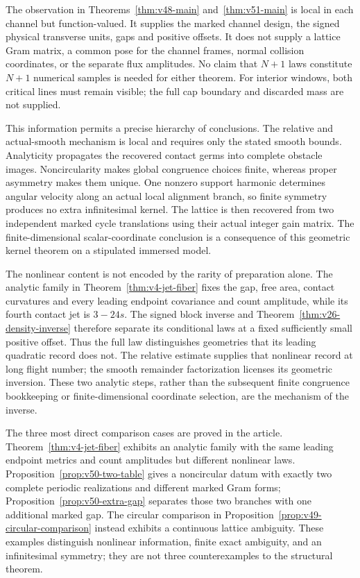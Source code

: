 The observation in Theorems~\ref{thm:v48-main} and~\ref{thm:v51-main}
is local in each channel but function-valued.  It supplies the marked
channel design, the signed physical transverse units, gaps and positive
offsets.  It does not supply a lattice Gram matrix, a common pose for
the channel frames, normal collision coordinates, or the separate flux
amplitudes.  No claim that $N+1$ laws constitute $N+1$ numerical samples
is needed for either theorem.  For interior windows, both critical
lines must remain visible; the full cap boundary and discarded mass
are not supplied.

This information permits a precise hierarchy of conclusions.  The
relative and actual-smooth mechanism is local and requires only the
stated smooth bounds.  Analyticity propagates the recovered contact
germs into complete obstacle images.  Noncircularity makes global
congruence choices finite, whereas proper asymmetry makes them unique.
One nonzero support harmonic determines angular velocity along an
actual local alignment branch, so finite symmetry produces no extra
infinitesimal kernel.  The lattice is then recovered from two independent
marked cycle translations using their actual integer gain matrix.
The finite-dimensional scalar-coordinate conclusion is a consequence
of this geometric kernel theorem on a stipulated immersed model.

The nonlinear content is not encoded by the rarity of preparation alone.
The analytic family in Theorem~\ref{thm:v4-jet-fiber} fixes the gap,
free area, contact curvatures and every leading endpoint covariance and
count amplitude, while its fourth contact jet is $3-24s$.  The signed
block inverse and Theorem~\ref{thm:v26-density-inverse} therefore
separate its conditional laws at a fixed sufficiently small positive
offset.  Thus the full law distinguishes geometries that its leading
quadratic record does not.  The relative estimate supplies that nonlinear
record at long flight number; the smooth remainder factorization licenses
its geometric inversion.  These two analytic steps, rather than the
subsequent finite congruence bookkeeping or finite-dimensional coordinate
selection, are the mechanism of the inverse.

The three most direct comparison cases are proved in the article.
Theorem~\ref{thm:v4-jet-fiber} exhibits an analytic family with the same
leading endpoint metrics and count amplitudes but different nonlinear
laws.  Proposition~\ref{prop:v50-two-table} gives a noncircular datum
with exactly two complete periodic realizations and different marked
Gram forms; Proposition~\ref{prop:v50-extra-gap} separates those two
branches with one additional marked gap.  The circular comparison in
Proposition~\ref{prop:v49-circular-comparison} instead exhibits a
continuous lattice ambiguity.  These examples distinguish nonlinear
information, finite exact ambiguity, and an infinitesimal symmetry;
they are not three counterexamples to the structural theorem.

